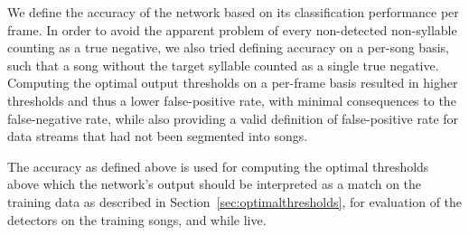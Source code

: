 \documentclass[10pt,letterpaper]{article}
\newcommand\sref[1]{Section~\ref{#1}}
\let\oldmarginpar\marginpar
\renewcommand{\marginpar}[1]{\oldmarginpar{\linespread{1}\scriptsize{#1}}}
\newcommand\argmin{\mathop{\textrm{{\rm argmin}}}\limits}
\newcommand{\noprint}[1]{}
\begin{document}
We define the accuracy of the network based on its classification
performance per frame. In order to avoid the apparent problem of every
non-detected non-syllable counting as a true negative, we also tried
defining accuracy on a per-song basis, such that a song without the
target syllable counted as a single true negative.  Computing the
optimal output thresholds on a per-frame basis resulted in higher
thresholds and thus a lower false-positive rate, with minimal
consequences to the false-negative rate, while also providing a valid
definition of false-positive rate for data streams that had not been
segmented into songs.




The accuracy as defined above is used for computing the optimal
thresholds above which the network's output should be interpreted as a
match on the training data as described in
\sref{sec:optimalthresholds}, for evaluation of the detectors on the
training songs, and while live.

\noprint{ Since the network will output values $o_t$ between 0 and 1
  at each moment $t$ in an attempt to match the training output, the
  optimal threshold $\tau\in[0,1]$ for the output neuron should be
  computed.  Given the relative cost of false positives vs.~false
  negatives $C$, and the acceptable time difference between target
  syllable and correct output $\Delta t_d$, we compute the optimal
  threshold for an output element according to the definitions above:
\begin{eqnarray*}
  \textrm{true positives}_\tau &=& \textrm{size of set}_{s\in \textrm{target songs}} o_t > \tau, \left| t \leq \Delta t_d \right| \\
  \textrm{false negatives}_\tau &=& \textrm{size of set} {s\in\textrm{target songs}} - \textrm{size of set} \textrm{true positives} \\
  \textrm{false positives}_\tau &=& \textrm{size of set}_{s\in \textrm{target songs}} o_t > \tau, \left| t > \Delta t_d \right| \\
  \widehat{\tau} &=& \argmin_\tau C\textrm{false positive} + \textrm{false negatives}
\end{eqnarray*}
}
\end{document}
